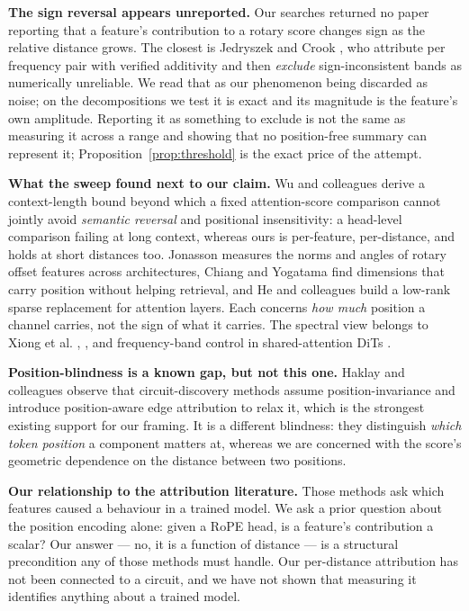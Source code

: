 \documentclass{article}
\theoremstyle{plain}
\theoremstyle{remark}
\begin{document}
\textbf{The sign reversal appears unreported.} Our searches returned no paper
reporting that a feature's contribution to a rotary score changes sign as the
relative distance grows. The closest is Jedryszek and Crook
\citep{jedryszek2026retrieval}, who attribute per frequency pair with verified
additivity and then \emph{exclude} sign-inconsistent bands as numerically
unreliable. We read that as our phenomenon being discarded as noise; on the
decompositions we test it is exact and its magnitude is the feature's own
amplitude. Reporting it as something to exclude is not the same as measuring it
across a range and showing that no position-free summary can represent it;
Proposition~\ref{prop:threshold} is the exact price of the attempt.

\textbf{What the sweep found next to our claim.} Wu and colleagues
\citep{wu2026endofrope} derive a context-length bound beyond which a fixed
attention-score comparison cannot jointly avoid \emph{semantic reversal} and
positional insensitivity: a head-level comparison failing at long context,
whereas ours is per-feature, per-distance, and holds at short distances too.
Jonasson \citep{jonasson2025rotaryoffset} measures the norms and angles of
rotary offset features across architectures, Chiang and Yogatama
\citep{chiang2025diminefficiency} find dimensions that carry position without
helping retrieval, and He and colleagues \citep{he2025lowrank} build a low-rank
sparse replacement for attention layers. Each concerns \emph{how much}
position a channel carries, not the sign of what it carries. The spectral view
belongs to Xiong et al. \citep{xiong2025dope}, \citet{li2026fingerprint}, and
frequency-band control in shared-attention DiTs
\citep{mikaeili2026untwistingrope}.

\textbf{Position-blindness is a known gap, but not this one.} Haklay and
colleagues \citep{haklay2025positionaware} observe that circuit-discovery
methods assume position-invariance and introduce position-aware edge
attribution to relax it, which is the strongest existing support for our
framing. It is a different blindness: they distinguish \emph{which token
position} a component matters at, whereas we are concerned with the score's
geometric dependence on the distance between two positions.

\textbf{Our relationship to the attribution literature.} Those methods ask
which features caused a behaviour in a trained model. We ask a prior question
about the position encoding alone: given a RoPE head, is a feature's
contribution a scalar? Our answer --- no, it is a function of distance --- is a
structural precondition any of those methods must handle. Our per-distance
attribution has not been connected to a circuit, and we have not shown that
measuring it identifies anything about a trained model.
\end{document}
